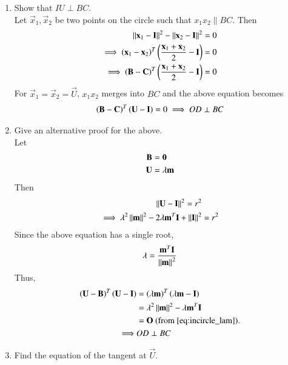 \begin{enumerate}[label=\arabic*.,ref=\thesubsection.\theenumi]
\item Show that $IU \perp BC$.
%
\\
\solution Let $\vec{x}_1,\vec{x}_2$ be two points on the circle such that 
$x_1x_2 \parallel BC$. Then
%
\begin{align}
\left\lVert\mathbf{x}_1-\mathbf{I}\right\rVert^2- 
\left\lVert\mathbf{x}_2-\mathbf{I}\right\rVert^2 &= 0 
\\
\implies 
\left(\mathbf{x}_1-\mathbf{x}_2\right)^T\left(\frac{\mathbf{x}_1+\mathbf{x}_2}{2}-\mathbf{I}\right) &= 
0 
\\
\implies 
\left(\mathbf{B}-\mathbf{C}\right)^T\left(\frac{\mathbf{x}_1+\mathbf{x}_2}{2}-\mathbf{I}\right) &= 
0 
\end{align}
%
For $\vec{x}_1=\vec{x}_2=\vec{U}$, $x_1x_2$ merges into $BC$ and the above 
equation becomes 
%
\begin{align}
\left(\mathbf{B}-\mathbf{C}\right)^T\left(\mathbf{U}-\mathbf{I}\right) = 
0 
\implies OD \perp BC
\end{align}
%
\item Give an alternative proof for the above.
\\
\solution Let 
\begin{align}
\mathbf{B} & = \mathbf{0}
\\
\mathbf{U} &= \lambda \mathbf{m}
\end{align}
Then
\begin{align}
\left\lVert\mathbf{U} - \mathbf{I}\right\rVert^2 = r^2 &
\\
\implies \lambda^2\left\lVert\mathbf{m}\right\rVert^2 - 2\lambda\mathbf{m}^T\mathbf{I} + \left\lVert\mathbf{I}\right\rVert^2 &= r^2 
\end{align}
Since the above equation has a single root,
\begin{align}
\lambda = \frac{\mathbf{m}^T\mathbf{I}}{\left\lVert\mathbf{m}\right\rVert^2}
\label{eq:incircle_lam}
\end{align}
%
Thus, 
\begin{align}
\left(\mathbf{U} - \mathbf{B}\right)^T\left(\mathbf{U} - \mathbf{I}\right)
&= \left(\lambda\mathbf{m}\right)^T
\left(\lambda\mathbf{m}-\mathbf{I}\right)
\\
&=\lambda^2\left\lVert\mathbf{m}\right\rVert^2-\lambda\mathbf{m}^T\mathbf{I}
\\
&= \mathbf{O} \text{ (from \ref{eq:incircle_lam})}.
\\
\implies & OD \perp BC
\end{align}
\item Find the equation of the tangent at $\vec{U}$.

\end{enumerate}
